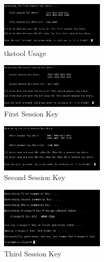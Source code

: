 \documentclass[a4paper]{article}
\begin{document}
\begin{itemize}
\begin{itemize}
\begin{itemize}
\begin{figure}[H]
                            \end{figure}
                            \begin{figure}[H]
                                \centering
                                \includegraphics[width=50mm]{tkstool-create-sharedSecret2.png}
                                \caption{tkstool Usage}
                            \end{figure}
                            \begin{figure}[H]
                                \centering
                                \includegraphics[width=50mm]{tkstool-create-sharedSecret3.png}
                                \caption{First Session Key}
                            \end{figure}
                            \begin{figure}[H]
                                \centering
                                \includegraphics[width=50mm]{tkstool-create-sharedSecret4.png}
                                \caption{Second Session Key}
                            \end{figure}
                            \begin{figure}[H]
                                \centering
                                \includegraphics[width=50mm]{tkstool-create-sharedSecret5.png}
                                \caption{Third Session Key}
                            \end{figure}

\end{itemize}
\end{itemize}
\end{itemize}
\end{document}
